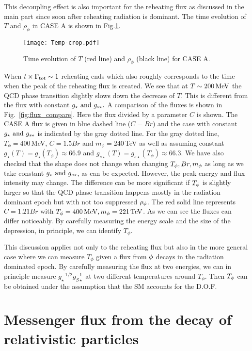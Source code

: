 \documentclass[superscriptaddress,aps,preprintnumbers,amsmath,showpacs,amssymb,prd,nofootinbib,reprint]{revtex4-1}
\begin{document}
{This decoupling effect is also important for the reheating flux as discussed in the main part since soon after reheating radiation is dominant. 
The time evolution of $T$ and $\rho_\phi$ in CASE A is shown in Fig.\ref{fig:0}.
\begin{figure}[t!]
\begin{center}  
\texttt{[image: Temp-crop.pdf]}
\end{center}
\caption{Time evolution of $T$ (red line) and $\rho_\phi$ (black line) for CASE A.}
\label{fig:0}
\end{figure}
{When $t\times  \Gamma_{\rm tot}\sim 1$ reheating ends which also roughly corresponds
to the time when the peak of the reheating flux is created.}
We see that at $T\sim 200{\rm \, MeV}$ the QCD phase transition slightly slows down the decrease of $T$. 
This is different from the flux with 
constant $g_\star ~{\rm and}~ g_{s\star}.$ 
A comparison of the fluxes is shown in Fig.~\ref{fig:flux_compare}.
Here the flux divided by a parameter $C$ is shown. The CASE A flux is given in blue dashed line ($C=Br$) and the case with constant $g_\star  ~{\rm and}~ g_{s \star}$ is indicated by the gray dotted line. For the gray dotted line, $T_\phi=400\,$MeV, $C=1.5 Br$ and $m_\phi=240\,$TeV  as well as assuming constant $g_\star(T)=g_\star(T_\phi)\approx 66.9$ and $g_{s\star}(T)=g_{s\star}(T_\phi)\approx 66.3$. We have also checked that the shape does not change when changing $T_\phi, Br, m_\phi$ as long as we take constant $g_\star ~{\rm and}~ g_{s\star}$, as can be expected. However, the peak energy and flux intensity may change. 
The difference can be more significant if $T_\phi$ is slightly larger so that the QCD phase transition happens mostly in the radiation dominant epoch but with not too suppressed $\rho_\phi$. The red solid line represents
$C= 1.21 { Br}$ with $T_\phi=400{\rm \, MeV}, m_\phi=221{\rm \, TeV}$. 
As we can see the fluxes can differ noticeably.
By carefully measuring the energy scale and the size of the depression, in principle, we can identify $T_\phi$.


This  discussion applies not only to the reheating flux but also in the more general case where we can measure $T_\phi$ given a flux from $\phi$ decays in the radiation dominated epoch.  By carefully measuring the flux at two energies, we can in principle measure  $g^{-1/2}_{\star}g^{-1}_{S\star}$ at two different temperatures around $T_\phi$. Then $T_{\phi}$ can be obtained under the assumption that the SM accounts for the D.O.F.




\section{Messenger flux from the decay of relativistic particles}\label{sec:preheating}

}
\end{document}
